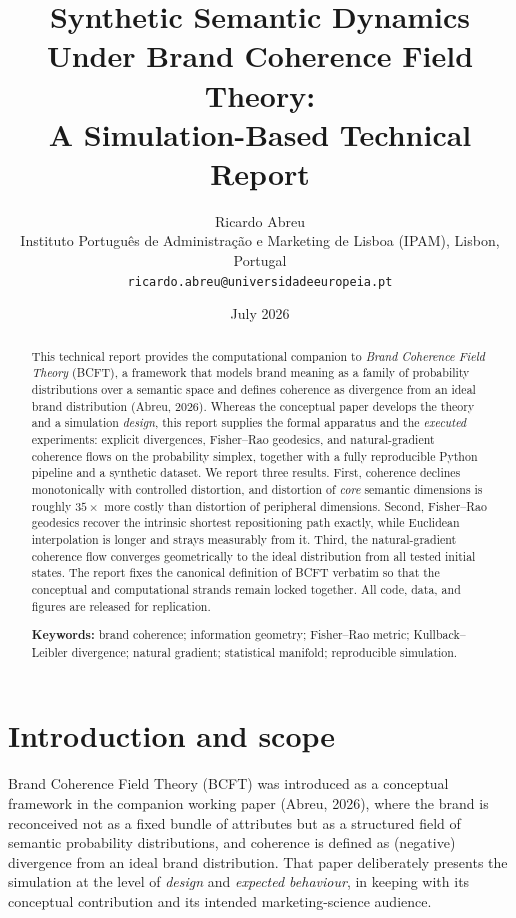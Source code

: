 \documentclass[11pt]{article}
\title{\textbf{Synthetic Semantic Dynamics Under Brand Coherence Field
Theory:\\ A Simulation-Based Technical Report}}
\author{Ricardo Abreu\\
\small Instituto Português de Administração e Marketing de Lisboa (IPAM), Lisbon, Portugal\\
\small \texttt{ricardo.abreu@universidadeeuropeia.pt}}
\date{July 2026}
\theoremstyle{remark}
\begin{document}
\maketitle

\begin{abstract}
\noindent This technical report provides the computational companion to
\emph{Brand Coherence Field Theory} (BCFT), a framework that models brand
meaning as a family of probability distributions over a semantic space and
defines coherence as divergence from an ideal brand distribution
(Abreu, 2026). Whereas the conceptual paper develops the theory and a
simulation \emph{design}, this report supplies the formal apparatus and the
\emph{executed} experiments: explicit divergences, Fisher--Rao geodesics, and
natural-gradient coherence flows on the probability simplex, together with a
fully reproducible Python pipeline and a synthetic dataset. We report three
results. First, coherence declines monotonically with controlled distortion,
and distortion of \emph{core} semantic dimensions is roughly $35\times$ more
costly than distortion of peripheral dimensions. Second, Fisher--Rao geodesics
recover the intrinsic shortest repositioning path exactly, while Euclidean
interpolation is longer and strays measurably from it. Third, the
natural-gradient coherence flow converges geometrically to the ideal
distribution from all tested initial states. The report fixes the canonical
definition of BCFT verbatim so that the conceptual and computational strands
remain locked together. All code, data, and figures are released for
replication.

\medskip
\noindent\textbf{Keywords:} brand coherence; information geometry; Fisher--Rao
metric; Kullback--Leibler divergence; natural gradient; statistical manifold;
reproducible simulation.
\end{abstract}

\section{Introduction and scope}
Brand Coherence Field Theory (BCFT) was introduced as a conceptual framework in
the companion working paper (Abreu, 2026), where the brand is reconceived not as
a fixed bundle of attributes but as a structured field of semantic probability
distributions, and coherence is defined as (negative) divergence from an ideal
brand distribution. That paper deliberately presents the simulation at the level
of \emph{design} and \emph{expected behaviour}, in keeping with its conceptual
contribution and its intended marketing-science audience.
\end{document}
